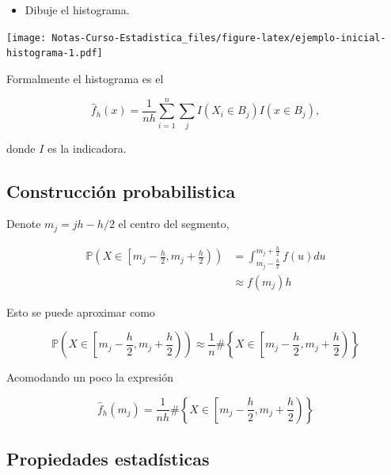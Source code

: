 \documentclass[
  12pt,
]{book}
\providecommand{\tightlist}{%
  \setlength{\itemsep}{0pt}\setlength{\parskip}{0pt}}
\theoremstyle{definition}
\theoremstyle{definition}
\theoremstyle{definition}
\theoremstyle{remark}
\begin{document}
\begin{itemize}
\tightlist
\item
  Dibuje el histograma.
\end{itemize}

\texttt{[image: Notas-Curso-Estadistica\_files/figure-latex/ejemplo-inicial-histograma-1.pdf]}

Formalmente el histograma es el

\begin{equation*}
\hat{f}_h(x) = \frac{1}{nh} \sum_{i = 1}^{n} \sum_{j} I(X_i\in B_j) I(x\in B_j),
\end{equation*}

donde \(I\) es la indicadora.

\hypertarget{construcciuxf3n-probabilistica}{%
\subsection{Construcción probabilistica}\label{construcciuxf3n-probabilistica}}

Denote \(m_j=jh-h/2\) el centro del segmento,

\begin{align*}
\mathbb{P}\left(X\in \left[m_j - \frac{h}{2},m_j + \frac{h}{2} \right)\right) & =
\int_{m_j - \frac{h}{2}}^{m_j + \frac{h}{2}} f(u)du                                             \\
& \approx f(m_j)h
\end{align*}

Esto se puede aproximar como

\begin{equation*}
\mathbb{P} \left(X\in \left[m_j - \frac{h}{2},m_j + \frac{h}{2}\right) \right)  \approx   \frac{1}{n} \#
\left\{X\in \left[m_j - \frac{h}{2},m_j + \frac{h}{2}\right) \right\}
\end{equation*}

Acomodando un poco la expresión

\begin{equation*}
\hat{f}_h(m_j) =  \frac{1}{nh} \#
\left\{X\in \left[m_j - \frac{h}{2},m_j + \frac{h}{2}\right) \right\}
\end{equation*}

\hypertarget{propiedades-estaduxedsticas}{%
\subsection{Propiedades estadísticas}\label{propiedades-estaduxedsticas}}
\end{document}
